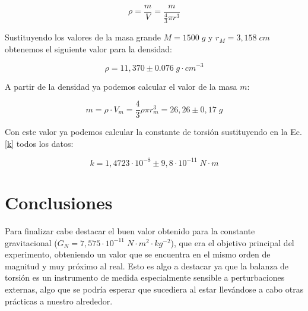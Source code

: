 \documentclass[a4paper,12pt,titlepage]{article}
\begin{document}
\begin{equation}
    \rho = \frac{m}{V} = \frac{m}{\frac{4}{3}\pi r^3}
\end{equation}

Sustituyendo los valores de la masa grande $M=1500 \;g$ y $r_{M}=3,158\;cm$ obtenemos el siguiente valor para la densidad:

\begin{equation}
    \rho = 11,370 \pm 0.076 \;g\cdot cm^{-3}
\end{equation}

A partir de la densidad ya podemos calcular el valor de la masa $m$:

\begin{equation}
    m = \rho \cdot V_m = \frac{4}{3}\rho \pi r_m^3 = 26,26 \pm 0,17 \;g
\end{equation}

Con este valor ya podemos calcular la constante de torsión sustituyendo en la Ec.\ref{k} todos los datos:

\begin{equation}
    k = 1,4723 \cdot 10^{-8} \pm 9,8 \cdot 10^{-11} \;N\cdot m
\end{equation}

\section{Conclusiones}

Para finalizar cabe destacar el buen valor obtenido para la constante gravitacional ($G_N = 7,575 \cdot 10^{-11}\;N\cdot m^2 \cdot kg^{-2}$), que era el objetivo principal del experimento, obteniendo un valor que se encuentra en el mismo orden de magnitud y muy próximo al real. Esto es algo a destacar ya que la balanza de torsión es un instrumento de medida especialmente sensible a perturbaciones externas, algo que se podría esperar que sucediera al estar llevándose a cabo otras prácticas a nuestro alrededor.
\end{document}
